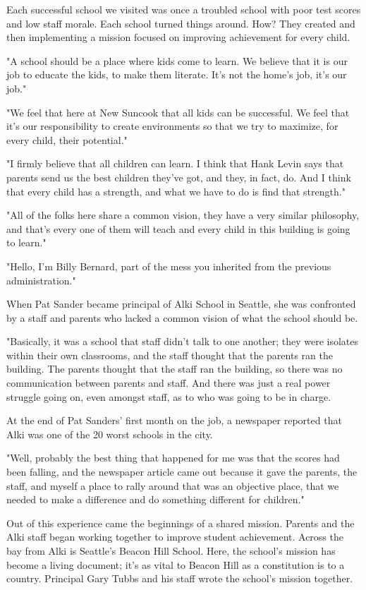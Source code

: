 Each successful school we visited was once a troubled school with poor test scores and low staff morale. Each school turned things around. How? They created and then implementing a mission focused on improving achievement for every child.

"A school should be a place where kids come to learn. We believe that it is our job to educate the kids, to make them literate. It's not the home's job, it's our job."

"We feel that here at New Suncook that all kids can be successful. We feel that it's our responsibility to create environments so that we try to maximize, for every child, their potential."

"I firmly believe that all children can learn. I think that Hank Levin says that parents send us the best children they've got, and they, in fact, do. And I think that every child has a strength, and what we have to do is find that strength."

"All of the folks here share a common vision, they have a very similar philosophy, and that's every one of them will teach and every child in this building is going to learn."

"Hello, I'm Billy Bernard, part of the mess you inherited from the previous administration."

When Pat Sander became principal of Alki School in Seattle, she was confronted by a staff and parents who lacked a common vision of what the school should be.

"Basically, it was a school that staff didn't talk to one another; they were isolates within their own classrooms, and the staff thought that the parents ran the building. The parents thought that the staff ran the building, so there was no communication between parents and staff. And there was just a real power struggle going on, even amongst staff, as to who was going to be in charge.

At the end of Pat Sanders' first month on the job, a newspaper reported that Alki was one of the 20 worst schools in the city.

"Well, probably the best thing that happened for me was that the scores had been falling, and the newspaper article came out because it gave the parents, the staff, and myself a place to rally around that was an objective place, that we needed to make a difference and do something different for children."

Out of this experience came the beginnings of a shared mission. Parents and the Alki staff began working together to improve student achievement. Across the bay from Alki is Seattle's Beacon Hill School. Here, the school's mission has become a living document; it's as vital to Beacon Hill as a constitution is to a country.
Principal Gary Tubbs and his staff wrote the school's mission together.

